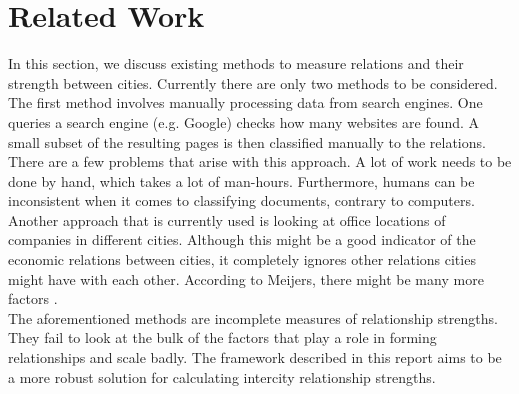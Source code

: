 \section{Related Work}
In this section, we discuss existing methods to measure relations and their strength between cities. Currently there are only two methods to be considered. \\

The first method involves manually processing data from search engines. One queries a search engine (e.g. Google) checks how many websites are found. A small subset of the resulting pages is then classified manually to the relations. There are a few problems that arise with this approach. A lot of work needs to be done by hand, which takes a lot of man-hours. Furthermore, humans can be inconsistent when it comes to classifying documents, contrary to computers. \\

Another approach that is currently used is looking at office locations of companies in different cities. Although this might be a good indicator of the economic relations between cities, it completely ignores other relations cities might have with each other. According to Meijers, there might be many more factors \cite{meijers2007synergy}.\\

The aforementioned methods are incomplete measures of relationship strengths. They fail to look at the bulk of the factors that play a role in forming relationships and scale badly. The framework described in this report aims to be a more robust solution for calculating intercity relationship strengths.
